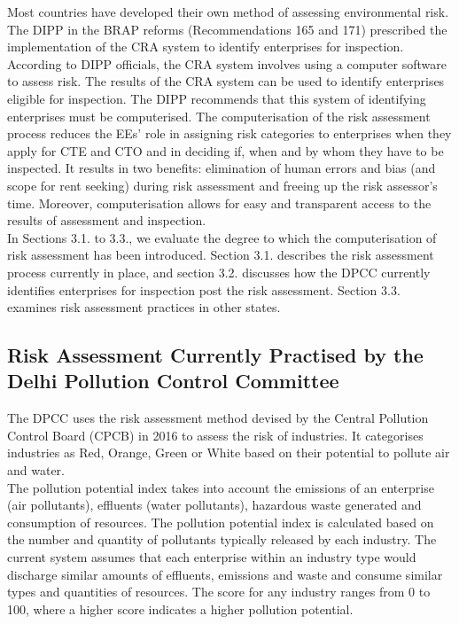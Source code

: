 \documentclass[a4paper, 12pt]{article}
\begin{document}
                 Most countries have developed their own method of assessing environmental risk. The DIPP in the BRAP reforms (Recommendations 165 and 171) prescribed the implementation of the CRA system to identify enterprises for inspection. \\ %
                 
                 According to DIPP officials, the CRA system involves using a computer software to assess risk. The results of the CRA system can be used to identify enterprises eligible for inspection. The DIPP recommends that this system of identifying enterprises must be computerised. The computerisation of the risk assessment process reduces the EEs’ role in assigning risk categories to enterprises when they apply for CTE and CTO and in deciding if, when and by whom they have to be inspected. It results in two benefits: elimination of human errors and bias (and scope for rent seeking) during  risk assessment and freeing up the risk assessor’s time. Moreover, computerisation allows for easy and transparent access to the results of assessment and inspection. \\
                 
                 In Sections 3.1. to 3.3., we evaluate the degree to which the computerisation of risk assessment has been introduced. Section 3.1. describes the risk assessment process currently in place, and section 3.2. discusses how the DPCC currently identifies enterprises for inspection post the risk assessment. Section 3.3. examines risk assessment practices in other states. \\ %
                 
                 \subsection{Risk Assessment Currently Practised by the Delhi Pollution Control Committee}\label{sec:1.1} %
                 
                 The DPCC uses the risk assessment method devised by the Central Pollution Control Board (CPCB) in 2016 to assess the risk of industries. It categorises industries as Red, Orange, Green or White based on their potential to pollute air and water. \\
                 
                 The pollution potential index takes into account the emissions of an enterprise (air pollutants), effluents (water pollutants), hazardous waste generated and consumption of resources. The pollution potential index is calculated based on the number and quantity of pollutants typically released by each industry. The current system assumes that each enterprise within an industry type would discharge similar amounts of effluents, emissions and waste and consume similar types and quantities of resources. The score for any industry ranges from 0 to 100, where a higher score indicates a higher pollution potential. \\
                 
\end{document}
